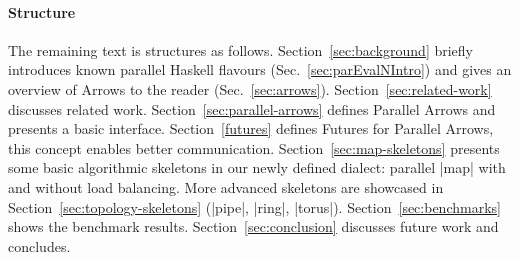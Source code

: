 

\paragraph{Structure}
The remaining text is structures as follows. Section~\ref{sec:background} briefly introduces known parallel Haskell flavours (Sec.~\ref{sec:parEvalNIntro}) and gives an overview of Arrows to the reader (Sec.~\ref{sec:arrows}). Section~\ref{sec:related-work} discusses related work. Section~\ref{sec:parallel-arrows} defines Parallel Arrows and presents a basic interface. Section~\ref{futures} defines Futures for Parallel Arrows, this concept enables better communication. Section~\ref{sec:map-skeletons} presents some basic algorithmic skeletons  in our newly defined dialect: parallel |map| with and without load balancing. More advanced skeletons are showcased in Section~\ref{sec:topology-skeletons} (|pipe|, |ring|, |torus|). Section~\ref{sec:benchmarks} shows the benchmark results. Section~\ref{sec:conclusion} discusses future work and concludes.

